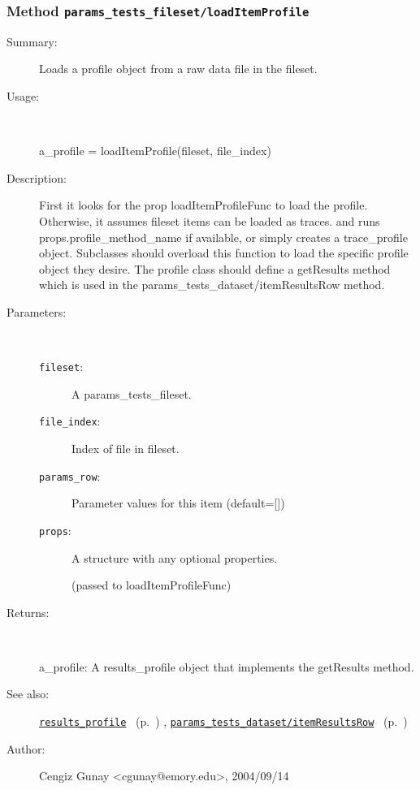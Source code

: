 \subsubsection[Method \texttt{loadItemProfile}]{Method \texttt{params\_tests\_fileset/loadItemProfile}}%
%
\label{ref_params_tests_fileset__loadItemProfile}%
\hypertarget{ref_params_tests_fileset__loadItemProfile}{}%
\begin{description}
\item[Summary:]Loads a profile object from a raw data file in the fileset.
%
\item[Usage:]~%
\begin{lyxcode}%
a\_profile = loadItemProfile(fileset, file\_index)
%
\end{lyxcode}%
%
\item[Description:]%
First it looks for the prop loadItemProfileFunc to load the
 profile. Otherwise, it assumes fileset items can be loaded as traces. and
 runs props.profile\_method\_name if available, or simply creates a
 trace\_profile object. Subclasses should overload this function to load the
 specific profile object they desire. The profile class should define a
 getResults method which is used in the params\_tests\_dataset/itemResultsRow
 method.
\item[Parameters:]~
\begin{description}%
\item[\texttt{fileset}:]
 A params\_tests\_fileset.
\item[\texttt{file\_index}:]
 Index of file in fileset.
\item[\texttt{params\_row}:]
 Parameter values for this item (default=[])
\item[\texttt{props}:]
 A structure with any optional properties.

(passed to loadItemProfileFunc)
\end{description}%
%
\item[Returns:
]~

   a\_profile: A results\_profile object that implements the getResults method.
%
%
\item[See also:]%
\hyperlink{ref_results_profile}{\texttt{results\_profile}}%
\ (p.~\pageref{ref_results_profile})%
%
, \hyperlink{ref_params_tests_dataset__itemResultsRow}{\texttt{params\_tests\_dataset/itemResultsRow}}%
\ (p.~\pageref{ref_params_tests_dataset__itemResultsRow})%
%
%
\item[Author:]%
Cengiz Gunay <cgunay@emory.edu>, 2004/09/14
%
\end{description}
\methodline%
